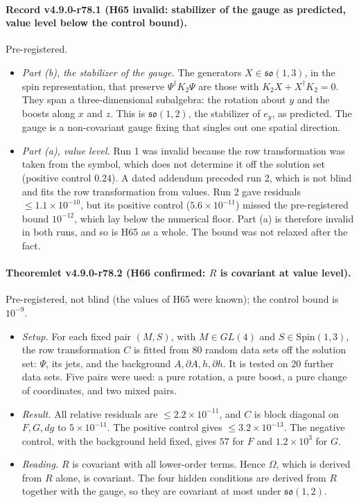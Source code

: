 \paragraph{Record v4.9.0-r78.1 (H65 invalid: stabilizer of the gauge as predicted, value level below the control bound).}
Pre-registered.
\begin{itemize}[leftmargin=2em]
\item \emph{Part (b), the stabilizer of the gauge.}  The generators \(X\in\mathfrak{so}(1,3)\), in the spin representation, that
preserve \(\Psi^\dagger K_2\Psi\) are those with \(K_2X+X^\dagger K_2=0\).  They span a three-dimensional subalgebra: the
rotation about \(y\) and the boosts along \(x\) and \(z\).  This is \(\mathfrak{so}(1,2)\), the stabilizer of \(e_y\), as
predicted.  The gauge is a non-covariant gauge fixing that singles out one spatial direction.
\item \emph{Part (a), value level.}  Run 1 was invalid because the row transformation was taken from the symbol, which does not
determine it off the solution set (positive control \(0.24\)).  A dated addendum preceded run 2, which is not blind and fits
the row transformation from values.  Run 2 gave residuals \(\le1.1\times10^{-10}\), but its positive control
(\(5.6\times10^{-11}\)) missed the pre-registered bound \(10^{-12}\), which lay below the numerical floor.  Part (a) is
therefore invalid in both runs, and so is H65 as a whole.  The bound was not relaxed after the fact.
\end{itemize}

\paragraph{Theoremlet v4.9.0-r78.2 (H66 confirmed: \(R\) is covariant at value level).}
Pre-registered, not blind (the values of H65 were known); the control bound is \(10^{-9}\).
\begin{itemize}[leftmargin=2em]
\item \emph{Setup.}  For each fixed pair \((M,S)\), with \(M\in GL(4)\) and \(S\in\mathrm{Spin}(1,3)\), the row
transformation \(C\) is fitted from 80 random data sets off the solution set: \(\Psi\), its jets, and the background
\(A,\partial A,h,\partial h\).  It is tested on 20 further data sets.  Five pairs were used: a pure rotation, a pure boost, a
pure change of coordinates, and two mixed pairs.
\item \emph{Result.}  All relative residuals are \(\le2.2\times10^{-11}\), and \(C\) is block diagonal on \(F,G,dg\) to
\(5\times10^{-11}\).  The positive control gives \(\le3.2\times10^{-13}\).  The negative control, with the background held
fixed, gives \(57\) for \(F\) and \(1.2\times10^3\) for \(G\).
\item \emph{Reading.}  \(R\) is covariant with all lower-order terms.  Hence \(\Omega\), which is derived from \(R\) alone, is
covariant.  The four hidden conditions are derived from \(R\) together with the gauge, so they are covariant at most under
\(\mathfrak{so}(1,2)\).
\end{itemize}

